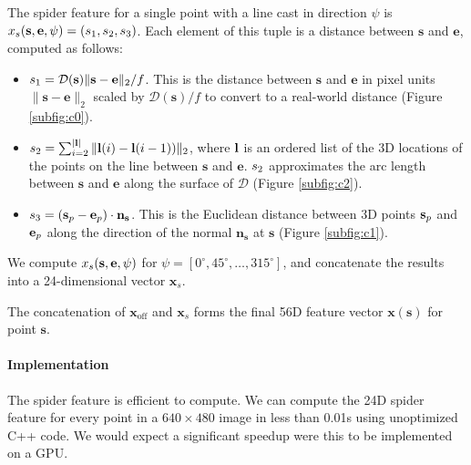 \documentclass[10pt,twocolumn,letterpaper]{article}
\newcommand{\degree}{^{\circ}}
\newcommand{\feat}{\mathbf{x}}
\newcommand{\rgbdimage}{\mathcal{D}}
\newcommand{\pixelidx}{\mathbf{s}}
\newcommand{\edgeimidx}{\mathbf{e}}
\newcommand{\normal}{\mathbf{n}}
\newcommand{\todo}[1]{\textcolor{red}{TODO: #1}}
\begin{document}
The spider feature for a single point with a line cast in direction $\psi$ is $\scalfeat_s(\pixelidx, \edgeimidx, \psi) = (\spiderfeat_1, \spiderfeat_2, \spiderfeat_3)$.
Each element of this tuple is a distance between $\pixelidx$ and $\edgeimidx$, computed as follows:
\begin{itemize}

\item $\spiderfeat_1 = \rgbdimage(\pixelidx) \|\pixelidx - \edgeimidx\|_2 / f$. This is the distance between $\pixelidx$ and $\edgeimidx$ in pixel units $\|\pixelidx - \edgeimidx\|_2$ scaled by $\rgbdimage(\pixelidx) / f$ to convert to a real-world distance (Figure \ref{subfig:c0}).

\item $s_2 = \sum_{i=2}^{|\mathbf{l}|} \| \mathbf{l}(i) - \mathbf{l}(i-1)) \|_2 $, where $\mathbf{l}$ is an ordered list of the 3D locations of the points on the line between $\pixelidx$ and $\edgeimidx$.
$s_2$ approximates the arc length between $\pixelidx$ and $\edgeimidx$ along the surface of $\rgbdimage$  (Figure \ref{subfig:c2}).

\item $\spiderfeat_3 = (\pointthreed - \edgethreed) \cdot \normal_\pixelidx$. 
This is the Euclidean distance between 3D points $\pointthreed$ and $\edgethreed$ along the direction of the normal $\normal_\pixelidx$ at $\pixelidx$  (Figure \ref{subfig:c1}).

\end{itemize}

We compute $\scalfeat_s(\pixelidx, \edgeimidx, \psi)$ for  $\psi = [0\degree, 45\degree, \ldots, 315\degree]$, and concatenate the results into a  24-dimensional vector $\feat_s$.

The concatenation of $\feat_\text{off}$ and $\feat_s$ forms the final 56D feature vector $\feat(\pixelidx)$ for point $\pixelidx$.

\paragraph{Implementation}
The spider feature is efficient to compute.
We can compute the 24D spider feature for every point in a $640\times480$ image in less than 0.01s using unoptimized C++ code.
We would expect a significant speedup were this to be implemented on a GPU.

\end{document}
